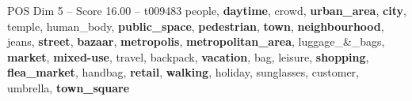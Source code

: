 \begin{textsample}{POS Dim 5 – Score 16.00 – t009483}  \label{ex:f5_pos_026}
people, \textbf{daytime}, crowd, \textbf{urban\_area}, \textbf{city}, temple, human\_body, \textbf{public\_space}, \textbf{pedestrian}, \textbf{town}, \textbf{neighbourhood}, jeans, \textbf{street}, \textbf{bazaar}, \textbf{metropolis}, \textbf{metropolitan\_area}, luggage\_\&\_bags, \textbf{market}, \textbf{mixed-use}, travel, backpack, \textbf{vacation}, bag, leisure, \textbf{shopping}, \textbf{flea\_market}, handbag, \textbf{retail}, \textbf{walking}, holiday, sunglasses, customer, umbrella, \textbf{town\_square}

\end{textsample}
